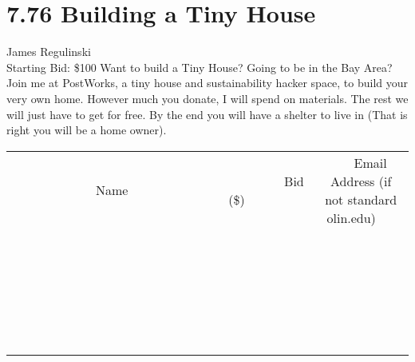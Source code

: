 \documentclass[11pt]{article}
\begin{document}
\section*{7.76 Building a Tiny House}
James Regulinski
\\
Starting Bid: \$100
\newline
Want to build a Tiny House? Going to be in the Bay Area? Join me at PostWorks, a tiny house and sustainability hacker space, to build your very own home.  However much you donate, I will spend on materials. The rest we will just have to get for free. By the end you will have a shelter to live in (That is right you will be a home owner).
\\[6ex]
\begin{tabular}{c c c}
~~~~~~~~~~~~~Name~~~~~~~~~~~~~ & ~~~~~~~~~Bid (\$)~~~~~~~~~  & ~~~Email Address (if not standard olin.edu)~~~\\
 & & \\
\hline
 & & \\
\hline
 & & \\
\hline
 & & \\
\hline
 & & \\
\hline
 & & \\
\hline
 & & \\
\hline
 & & \\
\hline
 & & \\
\hline
 & & \\
\hline
 & & \\
\hline
 & & \\
\hline
 & & \\
\hline
 & & \\
\hline
 & & \\
\hline
 & & \\
\hline
 & & \\
\hline
 & & \\
\hline
 & & \\
\hline
 & & \\
\hline
 & & \\
\hline
 & & \\
\hline
 & & \\
\hline
 & & \\
\hline
 & & \\
\hline
 & & \\
\hline
\end{tabular}
\newpage
\end{document}
